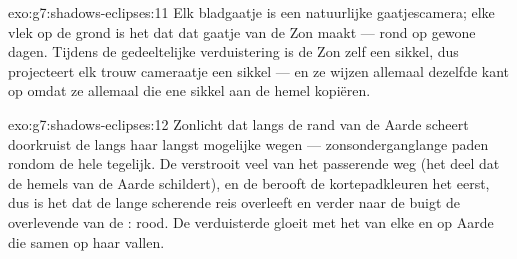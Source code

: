 \begin{solution}{exo:g7:shadows-eclipses:11}
Elk bladgaatje is een natuurlijke gaatjescamera; elke vlek op de grond
is het  dat dat gaatje van de Zon maakt --- rond op gewone dagen.
Tijdens de gedeeltelijke verduistering is de Zon zelf een
sikkel, dus projecteert elk trouw cameraatje een sikkel --- en
ze wijzen allemaal dezelfde kant op omdat ze allemaal die ene
sikkel aan de hemel kopiëren.
\end{solution}

\begin{solution}{exo:g7:shadows-eclipses:12}
Zonlicht dat langs de rand van de Aarde scheert doorkruist de
 langs haar langst mogelijke wegen ---
zonsonderganglange paden rondom de hele  tegelijk. De
 verstrooit veel van het passerende  weg (het deel dat de
hemels van de Aarde schildert), en de  berooft de
kortepadkleuren het eerst, dus is het  dat de lange scherende
reis overleeft en verder naar de  buigt de overlevende van de
: rood. De verduisterde  gloeit met het
 van elke  en  op Aarde die samen
op haar vallen.
\end{solution}

